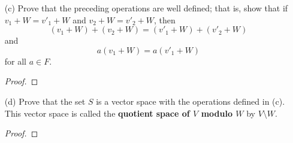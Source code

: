 \begin{enumerate}
\begin{proof}
        Conversely, suppose \( v_{1} - v_{2} \in W  \). By part (a), we know that \( (v_{1} - v_{2}) + W   \) is a subspace of \( V  \). Hence, \( 0_{V} \in (v_{1} - v_{2}) + W  \). This means that there exists \( w' \in W  \) such that 
        \begin{align*}
            &(v_{1} - v_{2}) + w' = 0_{V} \\
            &\implies v_{1} + w' = v_{2} + (w - w) \\
            &\implies v_{1} + \underbrace{(w' + w)}_{\in W} = v_{2} + \underbrace{w}_{\in W}.
        \end{align*}
        This tells us that \( v_{1} + W = v_{2} + W  \) and we are done.
        \end{proof}
    \item[(c)] Prove that the preceding operations are well defined; that is, show that if \( v_{1} + W = v'_{1} + W  \) and \( v_{2} + W = v'_{2} + W  \), then 
        \[  (v_{1} + W) + (v_{2} + W) = (v'_{1} + W) + (v'_{2} + W) \]
        and 
        \[  a(v_{1} + W) = a(v'_{1} + W) \]
        for all \( a \in F  \).
        \begin{proof}
        
        \end{proof}
    \item[(d)] Prove that the set \( S  \) is a vector space with the operations defined in (c). This vector space is called the \textbf{quotient space of \( V  \) modulo \( W \) } by \( V \setminus W   \).
        \begin{proof}
        
        \end{proof}
\end{enumerate}

